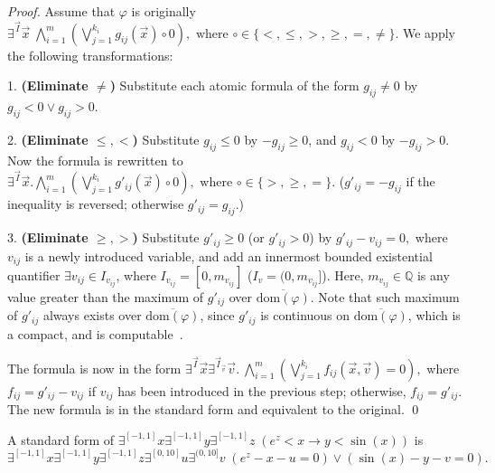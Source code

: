 \documentclass[prodmode]{acmsmall} %
\newcommand{\dom}{\mathrm{dom}}
\begin{document}
\begin{proof}
Assume that $\varphi$ is originally $\exists^{\vec I}\vec x\;\bigwedge_{i=1}^m (\bigvee_{j=1}^{k_i} g_{ij}(\vec x)\circ 0), \mbox{ where }\circ\in\{<,\leq, >, \geq, =,\neq\}.$ We apply the following transformations:

1. {\bf (Eliminate $\neq$)} Substitute each atomic formula of the form $g_{ij}\neq 0$ by $g_{ij}<0\vee g_{ij}>0$.

2. {\bf (Eliminate $\leq, <$)} Substitute $g_{ij}\leq 0$ by $-g_{ij}\geq 0$, and $g_{ij}<0$ by $-g_{ij}>0$. Now the formula is rewritten to $\exists^{\vec I}\vec x. \bigwedge_{i=1}^m (\bigvee_{j=1}^{k_i} g'_{ij}(\vec x)\circ 0), \mbox{ where } \circ\in\{>, \geq, = \}.$ ($g'_{ij} = -g_{ij}$ if the inequality is reversed; otherwise $g'_{ij}=g_{ij}$.)

3. {\bf (Eliminate $\geq, >$)} Substitute $g'_{ij}\geq 0$ (or $g'_{ij}>0$) by $g'_{ij}-v_{ij}=0,$ where $v_{ij}$ is a newly introduced variable, and add an innermost bounded existential quantifier $\exists v_{ij}\in I_{v_{ij}}$, where $I_{v_{ij}} = [0, m_{v_{ij}}]$ ($I_v=(0,m_{v_{ij}}]$). Here, $m_{v_{ij}}\in \mathbb{Q}$ is any value greater than the maximum of $g'_{ij}$ over $\overline{\dom(\varphi)}$. Note that such maximum of $g'_{ij}$ always exists over $\overline{\dom(\varphi)}$, since $g'_{ij}$ is continuous on $\overline{\dom(\varphi)}$, which is a compact, and is computable~\cite{Kobook}. 

The formula is now in the form $\exists^{\vec I}\vec x\exists^{\vec I_{\vec v}} \vec v.\ \bigwedge_{i=1}^m (\bigvee_{j=1}^{k_i} f_{ij}(\vec x, \vec v)=0),$ where $f_{ij} = g'_{ij}-v_{ij}$ if $v_{ij}$ has been introduced in the previous step; otherwise, $f_{ij} = g'_{ij}$. The new formula is in the standard form and equivalent to the original.
\qed\end{proof}
\begin{example}
A standard form of $\exists^{[-1,1]} x\exists^{[-1,1]} y\exists^{[-1,1]} z\;(e^z<x\rightarrow y<\sin(x))$ is $\exists^{[-1,1]} x\exists^{[-1,1]} y \exists^{[-1,1]} z \exists^{[0, 10]} u \exists^{(0,10]} v\;(e^z- x - u = 0) \vee (\sin(x)- y - v = 0).$
\end{example}
\end{document}
